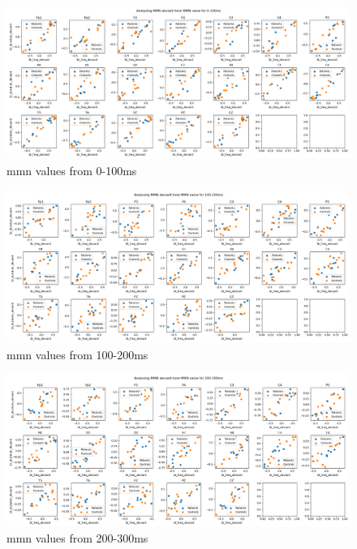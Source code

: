 \documentclass[10pt]{article}
\begin{document}
\begin{figure}[H]
  \includegraphics[width=16cm]{../../../data_analysis_results/MMN/features/deviant_tone_0.png}
  \caption{\gls{mmn} values from 0-100ms}\label{mmnvalue_0_100ms}
\end{figure}
\begin{figure}[H]
  \includegraphics[width=16cm]{../../../data_analysis_results/MMN/features/deviant_tone_1.png}
  \caption{\gls{mmn} values from 100-200ms}\label{mmnvalue_100_200ms}
\end{figure}
\begin{figure}[H]
  \includegraphics[width=16cm]{../../../data_analysis_results/MMN/features/deviant_tone_2.png}
  \caption{\gls{mmn} values from 200-300ms}\label{mmnvalue_200_300ms}
\end{figure}
\end{document}
